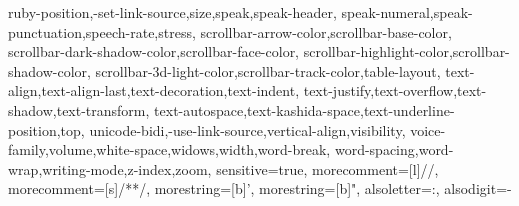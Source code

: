 {{			ruby-position,-set-link-source,size,speak,speak-header,
			speak-numeral,speak-punctuation,speech-rate,stress,
			scrollbar-arrow-color,scrollbar-base-color,
			scrollbar-dark-shadow-color,scrollbar-face-color,
			scrollbar-highlight-color,scrollbar-shadow-color,
			scrollbar-3d-light-color,scrollbar-track-color,table-layout,
			text-align,text-align-last,text-decoration,text-indent,
			text-justify,text-overflow,text-shadow,text-transform,
			text-autospace,text-kashida-space,text-underline-position,top,
			unicode-bidi,-use-link-source,vertical-align,visibility,
			voice-family,volume,white-space,widows,width,word-break,
			word-spacing,word-wrap,writing-mode,z-index,zoom},
	sensitive=true,
	morecomment=[l]{//},
	morecomment=[s]{/*}{*/},
	morestring=[b]',
	morestring=[b]",
	alsoletter={:},
	alsodigit={-}
}

